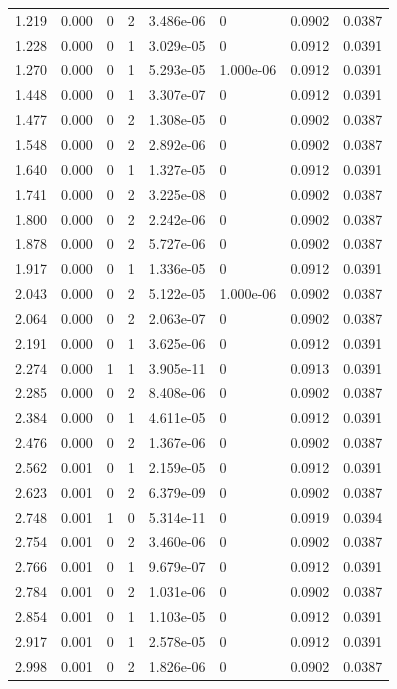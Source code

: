 \documentclass[preview]{standalone}
\begin{document}
{{\begin{tabular}{L{1.2cm}C{1.2cm} C{0.3cm}C{0.5cm} C{1.4cm}C{1.4cm} C{1.4cm}C{1.4cm}}
  1.219  &  0.000  & 0     &  2 &  3.486e-06  & 0  & 0.0902 &  0.0387   \\ 
  1.228  &  0.000  & 0     &  1 &  3.029e-05  & 0  & 0.0912 &  0.0391   \\ 
  1.270  &  0.000  & 0     &  1 &  5.293e-05  & 1.000e-06  & 0.0912 &  0.0391   \\ 
  1.448  &  0.000  & 0     &  1 &  3.307e-07  & 0  & 0.0912 &  0.0391   \\ 
  1.477  &  0.000  & 0     &  2 &  1.308e-05  & 0  & 0.0902 &  0.0387   \\ 
  1.548  &  0.000  & 0     &  2 &  2.892e-06  & 0  & 0.0902 &  0.0387   \\ 
  1.640  &  0.000  & 0     &  1 &  1.327e-05  & 0  & 0.0912 &  0.0391   \\ 
  1.741  &  0.000  & 0     &  2 &  3.225e-08  & 0  & 0.0902 &  0.0387   \\ 
  1.800  &  0.000  & 0     &  2 &  2.242e-06  & 0  & 0.0902 &  0.0387   \\ 
  1.878  &  0.000  & 0     &  2 &  5.727e-06  & 0  & 0.0902 &  0.0387   \\ 
  1.917  &  0.000  & 0     &  1 &  1.336e-05  & 0  & 0.0912 &  0.0391   \\ 
  2.043  &  0.000  & 0     &  2 &  5.122e-05  & 1.000e-06  & 0.0902 &  0.0387   \\ 
  2.064  &  0.000  & 0     &  2 &  2.063e-07  & 0  & 0.0902 &  0.0387   \\ 
  2.191  &  0.000  & 0     &  1 &  3.625e-06  & 0  & 0.0912 &  0.0391   \\ 
  2.274  &  0.000  & 1     &  1 &  3.905e-11  & 0  & 0.0913 &  0.0391   \\ 
  2.285  &  0.000  & 0     &  2 &  8.408e-06  & 0  & 0.0902 &  0.0387   \\ 
  2.384  &  0.000  & 0     &  1 &  4.611e-05  & 0  & 0.0912 &  0.0391   \\ 
  2.476  &  0.000  & 0     &  2 &  1.367e-06  & 0  & 0.0902 &  0.0387   \\ 
  2.562  &  0.001  & 0     &  1 &  2.159e-05  & 0  & 0.0912 &  0.0391   \\ 
  2.623  &  0.001  & 0     &  2 &  6.379e-09  & 0  & 0.0902 &  0.0387   \\ 
  2.748  &  0.001  & 1     &  0 &  5.314e-11  & 0  & 0.0919 &  0.0394   \\ 
  2.754  &  0.001  & 0     &  2 &  3.460e-06  & 0  & 0.0902 &  0.0387   \\ 
  2.766  &  0.001  & 0     &  1 &  9.679e-07  & 0  & 0.0912 &  0.0391   \\ 
  2.784  &  0.001  & 0     &  2 &  1.031e-06  & 0  & 0.0902 &  0.0387   \\ 
  2.854  &  0.001  & 0     &  1 &  1.103e-05  & 0  & 0.0912 &  0.0391   \\ 
  2.917  &  0.001  & 0     &  1 &  2.578e-05  & 0  & 0.0912 &  0.0391   \\ 
  2.998  &  0.001  & 0     &  2 &  1.826e-06  & 0  & 0.0902 &  0.0387   \\ 
\hline 
\end{tabular} 

}}
\end{document}
